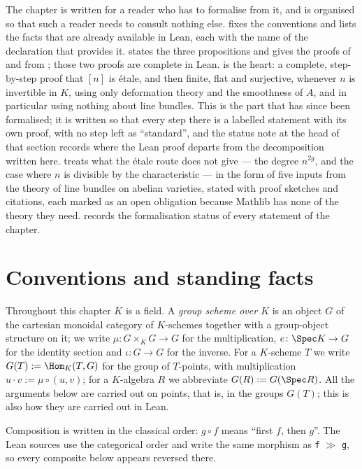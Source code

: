 The chapter is written for a reader who has to formalise from it, and is
organised so that such a reader needs to consult nothing else.
 fixes the conventions and lists the facts that are
already available in Lean, each with the name of the declaration that provides
it.   states the three propositions and gives
the proofs of  and  from
; those two proofs are complete in Lean.
 is the heart: a complete, step-by-step proof that
$[n]$ is \'etale, and then finite, flat and surjective, whenever $n$ is
invertible in $K$, using only deformation theory and the smoothness of $A$, and
in particular using nothing about line bundles.  This is the part that has
since been formalised; it is written so that every step there is a labelled
statement with its own proof, with no step left as ``standard'', and the status
note at the head of that section records where the Lean proof departs from the
decomposition written here.   treats what the \'etale route
does not give --- the degree $n^{2g}$, and the case where $n$ is divisible by
the characteristic --- in the form of five inputs from the theory of line
bundles on abelian varieties, stated with proof sketches and citations,
each marked as an open obligation because Mathlib has none of the theory they
need.   records the formalisation status of every statement
of the chapter.

\section{Conventions and standing facts}\label{sec:av-conventions}

Throughout this chapter $K$ is a field.  A \emph{group scheme over $K$} is an
object $G$ of the cartesian monoidal category of $K$-schemes together with a
group-object structure on it; we write $\mu\colon G\times_KG\to G$ for the
multiplication, $e\colon\Spec K\to G$ for the identity section and
$\iota\colon G\to G$ for the inverse.  For a $K$-scheme $T$ we write
$G(T):=\Hom_K(T,G)$ for the group of $T$-points, with multiplication
$u\cdot v:=\mu\circ(u,v)$; for a $K$-algebra $R$ we abbreviate
$G(R):=G(\Spec R)$.  All the arguments below are carried out on points, that
is, in the groups $G(T)$; this is also how they are carried out in Lean.

Composition is written in the classical order: $g\circ f$ means ``first $f$,
then $g$''.  The Lean sources use the categorical order and write the same
morphism as \texttt{f} $\gg$ \texttt{g}, so every composite below appears
reversed there.

